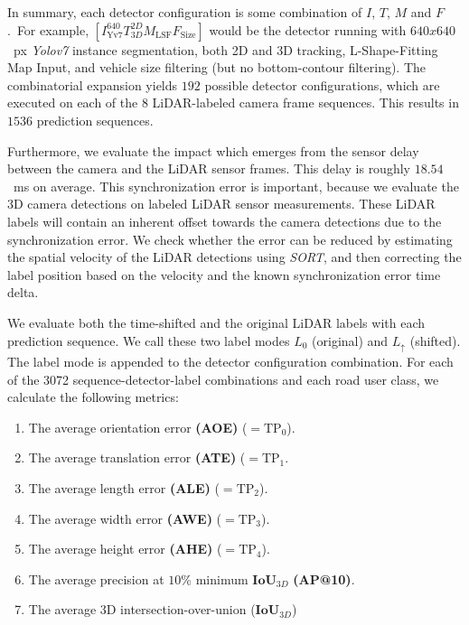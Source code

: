 In summary, each detector configuration is some combination of $I$, $T$, $M$ and $F$.\ For example, $\left[I^{640}_\text{Yv7}T^{2D}_{3D}M_\text{LSF}F_\text{Size}\right]$ would be the detector running with $640x640$~px \textit{Yolov7} instance segmentation, both 2D and 3D tracking, L-Shape-Fitting Map Input, and vehicle size filtering (but no bottom-contour filtering).
The combinatorial expansion yields $192$ possible detector configurations, which are executed on each of the $8$ LiDAR-labeled camera frame sequences.
This results in $1536$ prediction sequences.

Furthermore, we evaluate the impact which emerges from the sensor delay between the camera and the LiDAR sensor frames.
This delay is roughly $18.54$~ms on average.
This synchronization error is important, because we evaluate the 3D camera detections on labeled LiDAR sensor measurements.
These LiDAR labels will contain an inherent offset towards the camera detections due to the synchronization error.
We check whether the error can be reduced by estimating the spatial velocity of the LiDAR detections using \textit{SORT}, and then correcting the label position based on the velocity and the known synchronization error time delta.

We evaluate both the time-shifted and the original LiDAR labels with each prediction sequence.
We call these two label modes $L_0$ (original) and $L_{\uparrow}$ (shifted).
The label mode is appended to the detector configuration combination.
For each of the 3072 sequence-detector-label combinations and each road user class, we calculate the following metrics:

\begin{enumerate}
    \item The average orientation error \textbf{(AOE)} ($=\text{TP}_0$).
    \item The average translation error \textbf{(ATE)} ($=\text{TP}_1$.
    \item The average length error \textbf{(ALE)} ($=\text{TP}_2$).
    \item The average width error \textbf{(AWE)} ($=\text{TP}_3$).
    \item The average height error \textbf{(AHE)} ($=\text{TP}_4$).
    \item The average precision at $10$\% minimum $\mathbf{IoU}_{3D}$ \textbf{(AP@10)}.
    \item The average 3D intersection-over-union ($\mathbf{IoU}_{3D}$)
\end{enumerate}

